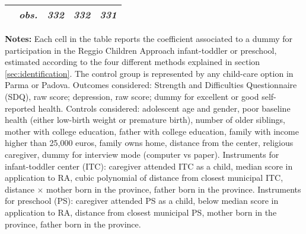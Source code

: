 \begin{table}[H]
\begin{centering}
\begin{tabular}{ r c ccc}
	 & \textit{obs.}	 & \textit{332}	 & \textit{332}	 & \textit{331}	\\
\hline		
\end{tabular}		
\par\end{centering}		
\vspace{2ex}					
\begin{footnotesize}
\textbf{Notes:} Each cell in the table reports the coefficient associated to a dummy for participation in the Reggio Children Approach infant-toddler or preschool, estimated according to the four different methods explained in section  \ref{sec:identification}.
The control group is represented by any child-care option in Parma or Padova.
Outcomes considered: Strength and Difficulties Questionnaire (SDQ), raw score; depression, raw score; dummy for excellent or good self-reported health. Controls considered: adolescent age and gender, poor baseline health (either low-birth weight or premature birth), number of older siblings, mother with college education, father with college education, family with income higher than 25,000 euros, family owns home, distance from the center, religious caregiver, dummy for interview mode (computer vs paper). 
Instruments for infant-toddler center (ITC): caregiver attended ITC as a child, median score in application to RA, cubic polynomial of distance from closest municipal ITC, distance $\times$ mother born in the province, father born in the province.	Instruments for preschool (PS): caregiver attended PS as a child, below median score in application to RA, distance from closest municipal PS, mother born in the province, father born in the province.				
\end{footnotesize}					
\end{table}					
